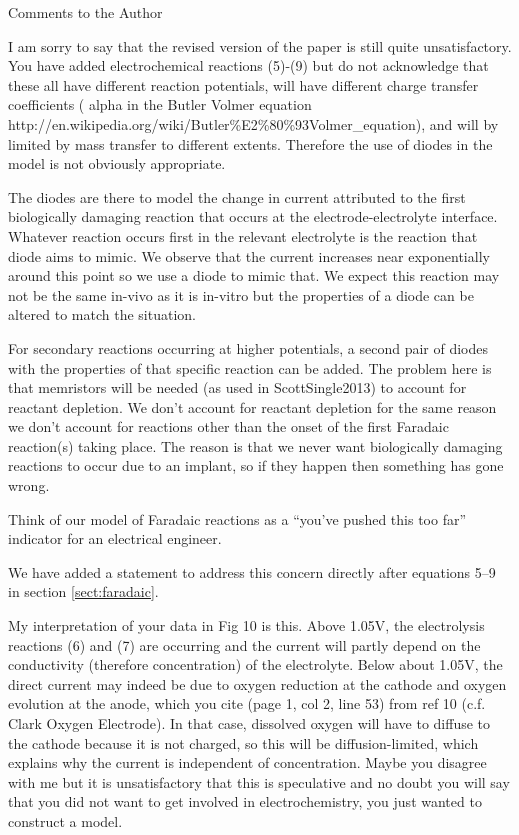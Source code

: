 \documentclass[journal, a4paper]{IEEEtran}
\begin{document}
Comments to the Author

{\color{OliveGreen}
    I am sorry to say that the revised version of the paper is still quite unsatisfactory. You have added electrochemical reactions (5)-(9) but do not acknowledge that these all have different reaction potentials, will have different charge transfer coefficients ( alpha in the Butler Volmer equation http://en.wikipedia.org/wiki/Butler\%E2\%80\%93Volmer\_equation), and will by limited by mass transfer to different extents. Therefore the use of diodes in the model is not obviously appropriate.

    {
        \color{blue}
        The diodes are there to model the change in current attributed to the first biologically damaging reaction that occurs at the electrode-electrolyte interface. Whatever reaction occurs first in the relevant electrolyte is the reaction that diode aims to mimic. We observe that the current increases near exponentially around this point so we use a diode to mimic that. We expect this reaction may not be the same in-vivo as it is in-vitro but the properties of a diode can be altered to match the situation.

        For secondary reactions occurring at higher potentials, a second pair of diodes with the properties of that specific reaction can be added. The problem here is that memristors will be needed (as used in ScottSingle2013) to account for reactant depletion. We don't account for reactant depletion for the same reason we don't account for reactions other than the onset of the first Faradaic reaction(s) taking place. The reason is that we never want biologically damaging reactions to occur due to an implant, so if they happen then something has gone wrong.

        Think of our model of Faradaic reactions as a ``you've pushed this too far'' indicator for an electrical engineer.

        We have added a statement to address this concern directly after equations 5--9 in section \ref{sect:faradaic}.
    }

    My interpretation of your data in Fig 10 is this. Above 1.05V, the electrolysis reactions (6) and (7) are occurring and the current will partly depend on the conductivity (therefore concentration) of the electrolyte. Below about 1.05V, the direct current may indeed be due to oxygen reduction at the cathode and oxygen evolution at the anode, which you cite (page 1, col 2, line 53) from ref 10 (c.f. Clark Oxygen Electrode). In that case, dissolved oxygen will have to diffuse to the cathode because it is not charged, so this will be diffusion-limited, which explains why the current is independent of concentration. Maybe you disagree with me but it is unsatisfactory that this is speculative and no doubt you will say that you did not want to get involved in electrochemistry, you just wanted to construct a model.

}
\end{document}
